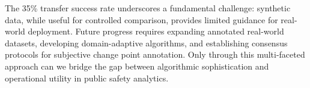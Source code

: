 The 35\% transfer success rate underscores a fundamental challenge: synthetic data, while useful for controlled comparison, provides limited guidance for real-world deployment. Future progress requires expanding annotated real-world datasets, developing domain-adaptive algorithms, and establishing consensus protocols for subjective change point annotation. Only through this multi-faceted approach can we bridge the gap between algorithmic sophistication and operational utility in public safety analytics.
